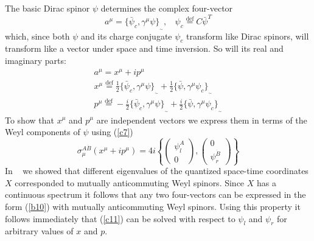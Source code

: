 \documentclass[a4paper,a4paper]{article}
\begin{document}
The basic Dirac spinor $\psi $ determines the complex four-vector 
\begin{equation} 
a^{\mu } = \{ \bar{\psi }_{c},\gamma ^{\mu }\psi \}_{_{ \sim }} , \ \ \ \  \psi
_{c}  \stackrel{ \mathrm{def}}{=} C\bar{\psi }^{T} 
\label{c7}
\end{equation}
which, since both $\psi $ and its charge conjugate $\psi _{c}$ transform like
Dirac spinors, will transform like a vector under space and time inversion. So
will its real and imaginary parts:
\begin{eqnarray} 
a^{\mu } = x^{\mu } + ip^{\mu }
\label{c8}
\\ x^{\mu } \stackrel{ \mathrm{def}}{=} \frac{1}{2}\{ \bar{\psi
}_{c},\gamma ^{\mu }\psi \}_{_{ \sim}
}+\frac{1}{2}\{ \bar{\psi },\gamma ^{\mu }\psi_{c} \}_{_{ \sim }}
\label{c9}
\\ p^{\mu } \stackrel{ \mathrm{def}}{=}  -\frac{i}{2} \{ \bar{\psi
}_{c},\gamma ^{\mu }\psi \}_{_{ \sim }}+\frac{i}{2} \{ \bar{\psi },\gamma ^{\mu
}\psi_{c} \}_{_{ \sim }}
\label{c10}
\end{eqnarray}
To show that $x^{\mu }$ and $p^{\mu }$ are independent vectors we express them
in terms of the Weyl components of $\psi $ using (\ref{c7})
\begin{equation} 
\sigma_{\mu}^{A\dot{B}}(x^{\mu}+ip^{\mu })= 4i\left \{ \left(
\begin{array}{c}\psi _{l}^{A}\\0 \end{array}
\right),\left( \begin{array}{c}0\\\psi _{r}^{\dot{B} } \end{array} \right)
\right\}    
\label{c11}
\end{equation}
In ~\cite{borch4} we showed that different eigenvalues of the quantized 
space-time coordinates $X$ corresponded to mutually anticommuting Weyl spinors.
Since $X$ has a continuous spectrum it follows that any two four-vectors can be
expressed in the form (\ref{b10}) with  mutually anticommuting Weyl spinors.
Using this property it follows immediately that (\ref{c11}) can be solved with
respect to $\psi _{l}$ and $\psi _{r}$ for arbitrary values of $x$ and $p$.
\end{document}
